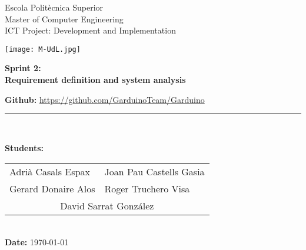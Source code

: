 \documentclass[11pt,a4paper]{article}
\begin{document}
\begin{titlepage}

\begin{flushleft}
Escola Politècnica Superior\\
\vspace*{0.15in}
Master of Computer Engineering\\
\vspace*{0.15in}
ICT Project: Development and Implementation
\end{flushleft}

\begin{center}
\vspace{2.0cm}\texttt{[image: M-UdL.jpg]}
\vspace{4.0cm}

\begin{LARGE}
\textbf{Sprint 2:}\\ 
\vspace*{0.15in}
\textbf{Requirement definition and system analysis}
\end{LARGE}
\vspace{5.0cm}

\vspace*{0.25in}
\textbf{Github: } \url{https://github.com/GarduinoTeam/Garduino}
\rule{80mm}{0.1mm}\\
\vspace*{0.1in}

\begin{large}
\textbf{Students:}

\begin{tabular}{ll}
Adrià Casals Espax  & Joan Pau Castells Gasia \\
Gerard Donaire Alos  & Roger Truchero Visa \\
\multicolumn{2}{c}{David Sarrat González}
\end{tabular}
\\
\vspace*{0.25in}
\textbf{Date:} \today \\
\end{large}

\end{center}
\end{titlepage}
 


\renewcommand{\headrulewidth}{0.5pt}
\renewcommand{\footrulewidth}{0.5pt}
\fancypagestyle{plain}{
\fancyhead[L]{}
\fancyhead[C]{}
\fancyhead[R]{\thepage}
\fancyfoot[L]{}
\fancyfoot[C]{}
\fancyfoot[R]{}
\renewcommand{\headrulewidth}{0pt}
\renewcommand{\footrulewidth}{0pt}
}
\pagestyle{fancy}
\vspace*{0.05in}
\end{document}
